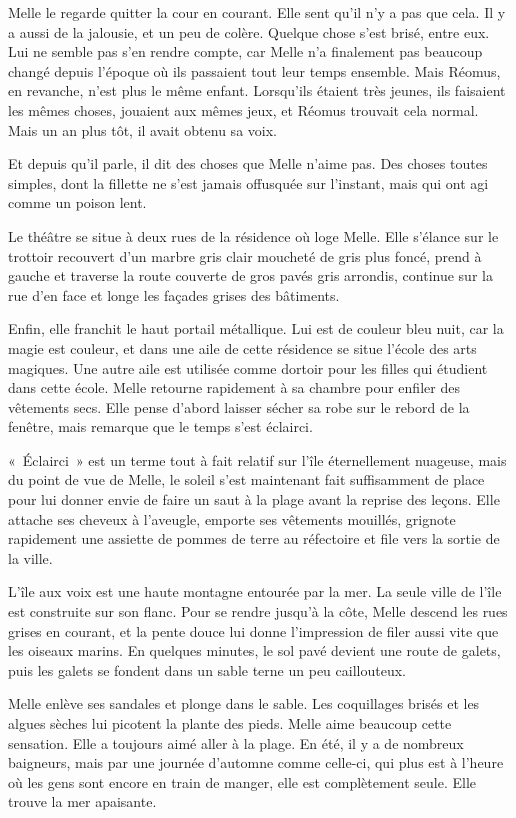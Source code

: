 Melle le regarde quitter la cour en courant. Elle sent qu'il n'y a pas que cela. Il y a aussi de la jalousie, et un peu de colère. Quelque chose s'est brisé, entre eux. Lui ne semble pas s'en rendre compte, car Melle n'a finalement pas beaucoup changé depuis l'époque où ils passaient tout leur temps ensemble. Mais Réomus, en revanche, n'est plus le même enfant. Lorsqu'ils étaient très jeunes, ils faisaient les mêmes choses, jouaient aux mêmes jeux, et Réomus trouvait cela normal. Mais un an plus tôt, il avait obtenu sa voix.

Et depuis qu'il parle, il dit des choses que Melle n'aime pas. Des choses toutes simples, dont la fillette ne s'est jamais offusquée sur l'instant, mais qui ont agi comme un poison lent.

\parbr

Le théâtre se situe à deux rues de la résidence où loge Melle. Elle s'élance sur le trottoir recouvert d'un marbre gris clair moucheté de gris plus foncé, prend à gauche et traverse la route couverte de gros pavés gris arrondis, continue sur la rue d'en face et longe les façades grises des bâtiments.

Enfin, elle franchit le haut portail métallique. Lui est de couleur bleu nuit, car la magie est couleur, et dans une aile de cette résidence se situe l'école des arts magiques. Une autre aile est utilisée comme dortoir pour les filles qui étudient dans cette école. Melle retourne rapidement à sa chambre pour enfiler des vêtements secs. Elle pense d'abord laisser sécher sa robe sur le rebord de la fenêtre, mais remarque que le temps s'est éclairci.

«~Éclairci~» est un terme tout à fait relatif sur l'île éternellement nuageuse, mais du point de vue de Melle, le soleil s'est maintenant fait suffisamment de place pour lui donner envie de faire un saut à la plage avant la reprise des leçons. Elle attache ses cheveux à l'aveugle, emporte ses vêtements mouillés, grignote rapidement une assiette de pommes de terre au réfectoire et file vers la sortie de la ville.

L'île aux voix est une haute montagne entourée par la mer. La seule ville de l'île est construite sur son flanc. Pour se rendre jusqu'à la côte, Melle descend les rues grises en courant, et la pente douce lui donne l'impression de filer aussi vite que les oiseaux marins. En quelques minutes, le sol pavé devient une route de galets, puis les galets se fondent dans un sable terne un peu caillouteux.

Melle enlève ses sandales et plonge dans le sable. Les coquillages brisés et les algues sèches lui picotent la plante des pieds. Melle aime beaucoup cette sensation. Elle a toujours aimé aller à la plage. En été, il y a de nombreux baigneurs, mais par une journée d'automne comme celle-ci, qui plus est à l'heure où les gens sont encore en train de manger, elle est complètement seule. Elle trouve la mer apaisante.

